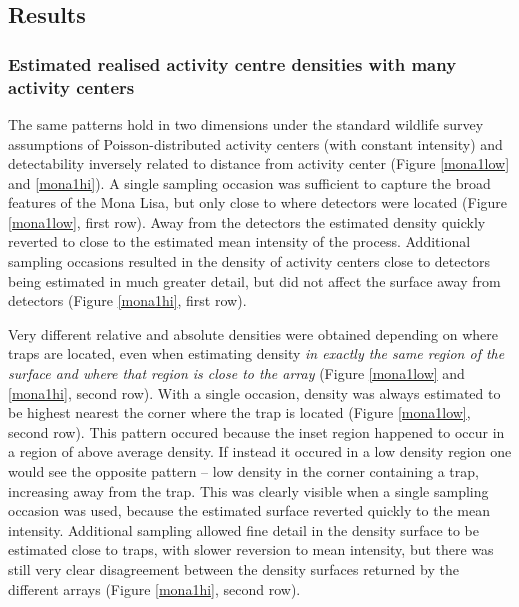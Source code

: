 \documentclass[10pt,a4paper]{article}
\begin{document}
\subsection{Results}

\subsubsection{Estimated realised activity centre densities with many activity centers}

The same patterns hold in two dimensions under the standard wildlife survey assumptions of Poisson-distributed activity centers (with constant intensity) and detectability inversely related to distance from activity center (Figure \ref{mona1low} and \ref{mona1hi}). A single sampling occasion was sufficient to capture the broad features of the Mona Lisa, but only close to where detectors were located (Figure \ref{mona1low}, first row). Away from the detectors the estimated density quickly reverted to close to the estimated mean intensity of the process. Additional sampling occasions resulted in the density of activity centers close to detectors being estimated in much greater detail, but did not affect the surface away from detectors (Figure \ref{mona1hi}, first row). 

Very different relative and absolute densities were obtained depending on where traps are located, even when estimating density {\it in exactly the same region of the surface and where that region is close to the array} (Figure \ref{mona1low} and \ref{mona1hi}, second row). With a single occasion, density was always estimated to be highest nearest the corner where the trap is located (Figure \ref{mona1low}, second row). This pattern occured because the inset region happened to occur in a region of above average density. If instead it occured in a low density region one would see the opposite pattern -- low density in the corner containing a trap, increasing away from the trap. This was clearly visible when a single sampling occasion was used, because the estimated surface reverted quickly to the mean intensity. Additional sampling allowed fine detail in the density surface to be estimated close to traps, with slower reversion to mean intensity, but there was still very clear disagreement between the density surfaces returned by the different arrays (Figure \ref{mona1hi}, second row).
\end{document}
